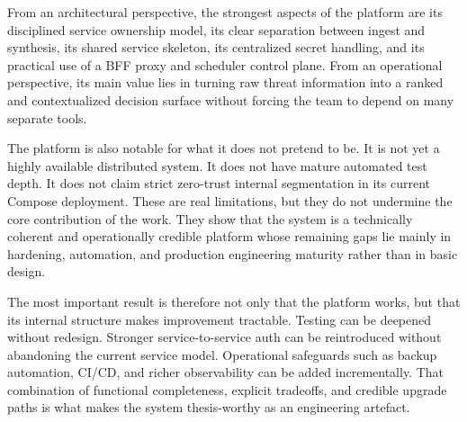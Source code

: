 From an architectural perspective, the strongest aspects of the platform are its disciplined service ownership model, its clear separation between ingest and synthesis, its shared service skeleton, its centralized secret handling, and its practical use of a BFF proxy and scheduler control plane. From an operational perspective, its main value lies in turning raw threat information into a ranked and contextualized decision surface without forcing the team to depend on many separate tools.

The platform is also notable for what it does not pretend to be. It is not yet a highly available distributed system. It does not have mature automated test depth. It does not claim strict zero-trust internal segmentation in its current Compose deployment. These are real limitations, but they do not undermine the core contribution of the work. They show that the system is a technically coherent and operationally credible platform whose remaining gaps lie mainly in hardening, automation, and production engineering maturity rather than in basic design.

The most important result is therefore not only that the platform works, but that its internal structure makes improvement tractable. Testing can be deepened without redesign. Stronger service-to-service auth can be reintroduced without abandoning the current service model. Operational safeguards such as backup automation, CI/CD, and richer observability can be added incrementally. That combination of functional completeness, explicit tradeoffs, and credible upgrade paths is what makes the system thesis-worthy as an engineering artefact.
